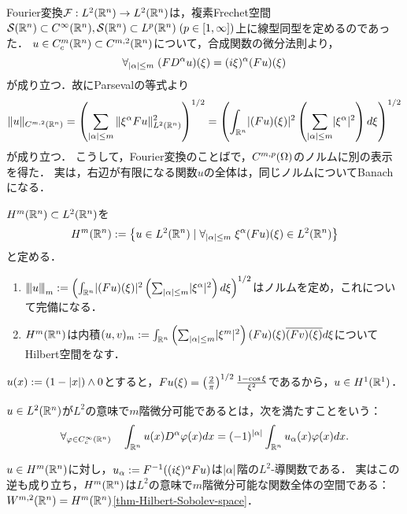 \documentclass[uplatex,dvipdfmx]{jsreport}
\begin{document}
\begin{discussion}
    Fourier変換$\mathcal{F}:L^2(\mathbb{R}^n)\to L^2(\mathbb{R}^n)$は，複素Frechet空間$\mathcal{S}(\mathbb{R}^n)\subset C^\infty(\mathbb{R}^n),\mathcal{S}(\mathbb{R}^n)\subset L^p(\mathbb{R}^n)\;(p\in[1,\infty])$上に線型同型を定めるのであった．
    $u\in C^m_c(\mathbb{R}^n)\subset C^{m,2}(\mathbb{R}^n)$について，合成関数の微分法則より，
    \[\forall_{\lvert\alpha\rvert\le m}\;(FD^\alpha u)(\xi)=(i\xi)^\alpha(Fu)(\xi)\]
    が成り立つ．故にParsevalの等式より
    \[\|u\|_{C^{m,2}(\mathbb{R}^n)}=\left(\sum_{\lvert\alpha\rvert\le m}\|\xi^\alpha Fu\|^2_{L^2(\mathbb{R}^n)}\right)^{1/2}=\left(\int_{\mathbb{R}^n}\lvert(Fu)(\xi)\rvert^2\left(\sum_{\lvert\alpha\rvert\le m}\lvert\xi^\alpha\rvert^2\right)d\xi\right)^{1/2}\]
    が成り立つ．
    こうして，Fourier変換のことばで，$C^{m,p}(\Omega)$のノルムに別の表示を得た．
    実は，右辺が有限になる関数$u$の全体は，同じノルムについてBanachになる．
\end{discussion}

\begin{proposition}
    $H^m(\mathbb{R}^n)\subset L^2(\mathbb{R}^n)$を
    \[H^m(\mathbb{R}^n):=\left\{u\in L^2(\mathbb{R}^n)\mid\forall_{\lvert\alpha\rvert\le m}\;\xi^\alpha(Fu)(\xi)\in L^2(\mathbb{R}^n)\right\}\]
    と定める．
    \begin{enumerate}
        \item ${\left\vert\kern-0.25ex\left\vert\kern-0.25ex\left\vert u \right\vert\kern-0.25ex\right\vert\kern-0.25ex\right\vert}_m:=\left(\int_{\mathbb{R}^n}\lvert(Fu)(\xi)\rvert^2\left(\sum_{\lvert\alpha\rvert\le m}\lvert\xi^\alpha\rvert^2\right)d\xi\right)^{1/2}$はノルムを定め，これについて完備になる．
        \item $H^m(\mathbb{R}^n)$は内積$(u,v)_m:=\int_{\mathbb{R}^n}\left(\sum_{\lvert\alpha\rvert\le m}\lvert\xi^m\rvert^2\right)(Fu)(\xi)\overline{(Fv)(\xi)}d\xi$についてHilbert空間をなす．
    \end{enumerate}
\end{proposition}

\begin{example}[Sobolev空間の微分不可能な元]
    $u(x):=(1-\lvert x\rvert)\land0$とすると，$Fu(\xi)=\left(\frac{2}{\pi}\right)^{1/2}\frac{1-\cos\xi}{\xi^2}$であるから，$u\in H^1(\mathbb{R}^1)$．
\end{example}

\begin{definition}
    $u\in L^2(\mathbb{R}^n)$が$L^2$の意味で$m$階微分可能であるとは，次を満たすことをいう：
    \[\forall_{\varphi\in C_c^\infty(\mathbb{R}^n)}\quad\int_{\mathbb{R}^n}u(x)D^\alpha\varphi(x)dx=(-1)^{\lvert\alpha\rvert}\int_{\mathbb{R}^n}u_\alpha(x)\varphi(x)dx.\]
\end{definition}
\begin{lemma}
    $u\in H^m(\mathbb{R}^n)$に対し，$u_\alpha:=F^{-1}((i\xi)^\alpha Fu)$は$\lvert\alpha\rvert$階の$L^2$-導関数である．
    実はこの逆も成り立ち，$H^m(\mathbb{R}^n)$は$L^2$の意味で$m$階微分可能な関数全体の空間である：$W^{m,2}(\mathbb{R}^n)=H^m(\mathbb{R}^n)$\ref{thm-Hilbert-Sobolev-space}．
\end{lemma}
\end{document}
